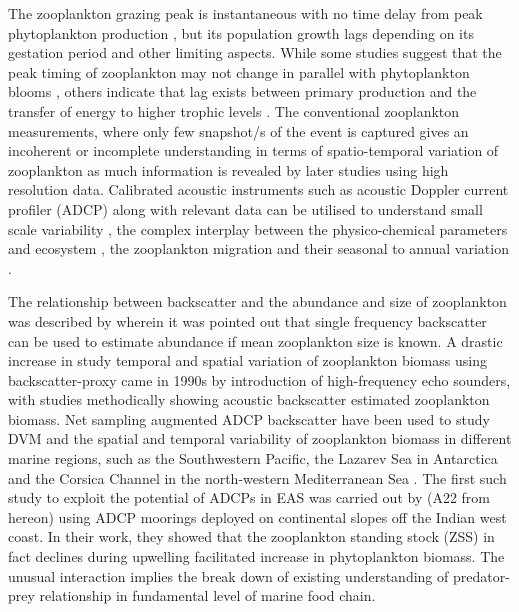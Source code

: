 \documentclass{article}
\begin{document}
	The zooplankton grazing peak is instantaneous with no time delay from peak phytoplankton production \citep{li2000determines,barber2001qn}, but its population growth lags \citep{rehim2012dynamical, almen2020temperature} depending on its gestation period and other limiting aspects. While some studies suggest that the peak timing of zooplankton may not change in parallel with phytoplankton blooms \citep{winder2004climatic}, others indicate that lag exists between primary production and the transfer of energy to higher trophic levels \citep{brock1992interannual, brock1991phytoplankton}. The conventional zooplankton measurements, where only few snapshot/s of the event is captured gives an incoherent or incomplete understanding in terms of spatio-temporal variation of zooplankton \citep{ramamurthy1965studies, piontkovski1995spatial, madhupratap1992zooplankton,madhupratap1996lack,wishner1998mesozooplankton,kidwai2000dd,barber2001qn,khandagale2022seasonal} as much information is revealed by later studies \citep{jyothibabu2010re, shankar2019role, aparna2022seasonal} using high resolution data. Calibrated acoustic instruments such as acoustic Doppler current profiler (ADCP) along with relevant data can be utilised to understand small scale variability \citep{nair1999arabian, edvardsen2003assessing, smith2005mesozooplankton, smeti2015spatial, kang2024acoustic}, the complex interplay between the physico-chemical parameters and ecosystem \citep{jiang2007temporal, potiris2018acoustic, shankar2019role, aparna2022seasonal, nie2023influence}, the zooplankton migration \citep{inoue2016diel,ursella2018evidence, ursella2021diel} and their seasonal to annual variation \citep{jiang2007temporal, hobbs2021marine,liu2022seasonal, aparna2022seasonal}.
	
    The relationship between backscatter and the abundance and size of zooplankton was described by \citet{greenlaw1979acoustical} wherein it was pointed out that single frequency backscatter can be used to estimate abundance if mean zooplankton size is known. A drastic increase in study temporal and spatial variation of zooplankton biomass using  backscatter-proxy came in 1990s by introduction of high-frequency echo sounders, with studies \citep{flagg1989use, wiebe1990sound, batchelder00981, greene1998three, rippeth1998diur} methodically showing acoustic backscatter estimated zooplankton biomass.
	Net sampling augmented ADCP backscatter have been used to study DVM and the spatial and temporal variability of zooplankton biomass in different marine regions, such as the Southwestern Pacific, the Lazarev Sea in Antarctica and the Corsica Channel in the north-western Mediterranean Sea \citep{cisewski2010seasonal,hamilton2013links, smeti2015spatial, guerra2019zooplankton}. The first such study to exploit the potential of ADCPs in EAS was carried out by \citet{aparna2022seasonal} (A22 from hereon) using ADCP moorings deployed on continental slopes off the Indian west coast.	In their work, they showed that the zooplankton standing stock (ZSS) in fact declines during upwelling facilitated increase in phytoplankton biomass. The unusual interaction implies the break down of existing understanding of predator-prey relationship in fundamental level of marine food chain.
	
\end{document}
